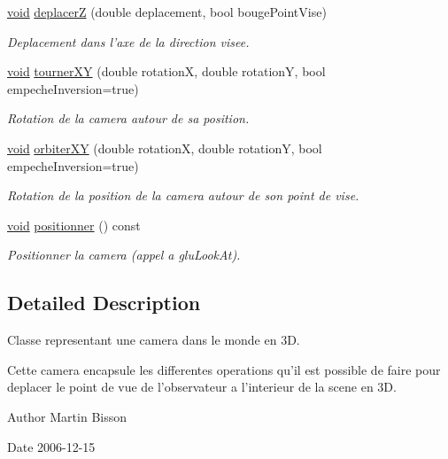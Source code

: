 \begin{DoxyCompactItemize}
\hyperlink{wglew_8h_aeea6e3dfae3acf232096f57d2d57f084}{void} \hyperlink{classvue_1_1_camera_a7e8dfbbf743a74bb0387e140fee09474}{deplacer\-Z} (double deplacement, bool bouge\-Point\-Vise)
\begin{DoxyCompactList}\small\item\em Deplacement dans l'axe de la direction visee. \end{DoxyCompactList}\item 
\hyperlink{wglew_8h_aeea6e3dfae3acf232096f57d2d57f084}{void} \hyperlink{classvue_1_1_camera_a07795ebc629c68f8694b9ae08a53457f}{tourner\-X\-Y} (double rotation\-X, double rotation\-Y, bool empeche\-Inversion=true)
\begin{DoxyCompactList}\small\item\em Rotation de la camera autour de sa position. \end{DoxyCompactList}\item 
\hyperlink{wglew_8h_aeea6e3dfae3acf232096f57d2d57f084}{void} \hyperlink{classvue_1_1_camera_a5e88216d5d5b31e0e65be9674e5904ef}{orbiter\-X\-Y} (double rotation\-X, double rotation\-Y, bool empeche\-Inversion=true)
\begin{DoxyCompactList}\small\item\em Rotation de la position de la camera autour de son point de vise. \end{DoxyCompactList}\item 
\hyperlink{wglew_8h_aeea6e3dfae3acf232096f57d2d57f084}{void} \hyperlink{classvue_1_1_camera_a201db90bcebf204990f1dbb6db03b563}{positionner} () const 
\begin{DoxyCompactList}\small\item\em Positionner la camera (appel a glu\-Look\-At). \end{DoxyCompactList}\end{DoxyCompactItemize}


\subsection{Detailed Description}
Classe representant une camera dans le monde en 3\-D. 

Cette camera encapsule les differentes operations qu'il est possible de faire pour deplacer le point de vue de l'observateur a l'interieur de la scene en 3\-D.

\begin{DoxyAuthor}{Author}
Martin Bisson 
\end{DoxyAuthor}
\begin{DoxyDate}{Date}
2006-\/12-\/15 
\end{DoxyDate}


